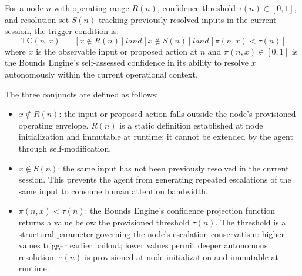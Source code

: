 \begin{definition}
\label{def:tc}
For a node $n$ with operating range $R(n)$, confidence threshold $\tau(n) \in [0, 1]$, and resolution set $S(n)$ tracking previously resolved inputs in the current session, the trigger condition is:
\begin{equation}
\text{TC}(n, x)
\;=\;
\bigl[\,x \notin R(n)\,\bigr]
\;land\;
\bigl[\,x \notin S(n)\,\bigr]
\;land\;
\bigl[\,\pi(n, x) < \tau(n)\,\bigr]
\tag{TC}
\end{equation}
where $x$ is the observable input or proposed action at $n$ and $\pi(n, x) \in [0, 1]$ is the Bounds Engine's self-assessed confidence in its ability to resolve $x$ autonomously within the current operational context.

The three conjuncts are defined as follows:

\begin{itemize}\itemsep=0pt
\item[\textbf{Bound violation}] $x \notin R(n)$: the input or proposed action falls outside the node's provisioned operating envelope. $R(n)$ is a static definition established at node initialization and immutable at runtime; it cannot be extended by the agent through self-modification.

\item[\textbf{Non-redundancy}] $x \notin S(n)$: the same input has not been previously resolved in the current session. This prevents the agent from generating repeated escalations of the same input to consume human attention bandwidth.

\item[\textbf{Confidence deficit}] $\pi(n, x) < \tau(n)$: the Bounds Engine's confidence projection function returns a value below the provisioned threshold $\tau(n)$. The threshold is a structural parameter governing the node's escalation conservatism: higher values trigger earlier bailout; lower values permit deeper autonomous resolution. $\tau(n)$ is provisioned at node initialization and immutable at runtime.
\end{itemize}
\end{definition}

